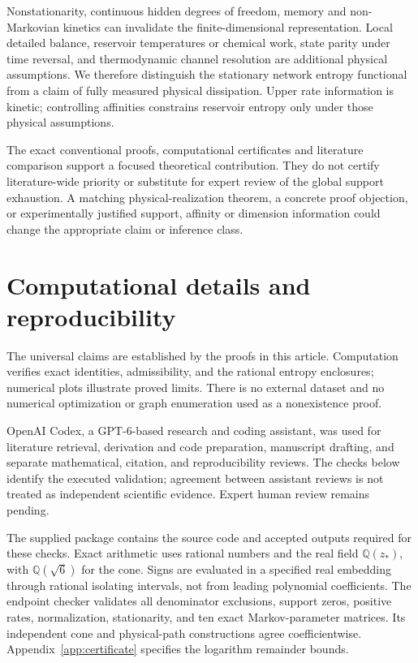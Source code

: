 \documentclass[aps,pre,onecolumn,11pt,longbibliography,notitlepage]{revtex4-2}
\newcommand{\1}{\mathbf 1}
\newcommand{\zs}{z_*}
\begin{document}
Nonstationarity, continuous hidden degrees of freedom, memory and non-Markovian kinetics can invalidate the finite-dimensional representation. Local detailed balance, reservoir temperatures or chemical work, state parity under time reversal, and thermodynamic channel resolution are additional physical assumptions. We therefore distinguish the stationary network entropy functional from a claim of fully measured physical dissipation. Upper rate information is kinetic; controlling affinities constrains reservoir entropy only under those physical assumptions.

The exact conventional proofs, computational certificates and literature comparison support a focused theoretical contribution. They do not certify literature-wide priority or substitute for expert review of the global support exhaustion. A matching physical-realization theorem, a concrete proof objection, or experimentally justified support, affinity or dimension information could change the appropriate claim or inference class.

\section{Computational details and reproducibility}\label{sec:methods}
The universal claims are established by the proofs in this article. Computation verifies exact identities, admissibility, and the rational entropy enclosures; numerical plots illustrate proved limits. There is no external dataset and no numerical optimization or graph enumeration used as a nonexistence proof.

OpenAI Codex, a GPT-6-based research and coding assistant, was used for literature retrieval, derivation and code preparation, manuscript drafting, and separate mathematical, citation, and reproducibility reviews. The checks below identify the executed validation; agreement between assistant reviews is not treated as independent scientific evidence. Expert human review remains pending.

The supplied package contains the source code and accepted outputs required for these checks. Exact arithmetic uses rational numbers and the real field $\mathbb Q(\zs)$, with $\mathbb Q(\sqrt6)$ for the cone. Signs are evaluated in a specified real embedding through rational isolating intervals, not from leading polynomial coefficients. The endpoint checker validates all denominator exclusions, support zeros, positive rates, normalization, stationarity, and ten exact Markov-parameter matrices. Its independent cone and physical-path constructions agree coefficientwise. Appendix~\ref{app:certificate} specifies the logarithm remainder bounds.
\end{document}
